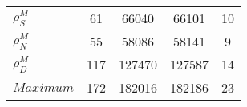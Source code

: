 \begin{center}
\begin{longtable}{lcccc}
$ {\rho^{M}_{S}}       $	 & 	                   61	 & 	                66040	 & 	                66101	 & 	                   10 \\ 
$ {\rho^{M}_{N}}       $	 & 	                   55	 & 	                58086	 & 	                58141	 & 	                    9 \\ 
$ {\rho^{M}_{D}}       $	 & 	                  117	 & 	               127470	 & 	               127587	 & 	                   14 \\ 
$Maximum               $	 & 	                  172	 & 	               182016	 & 	               182186	 & 	                   23 \\ 
\end{longtable}
 \end{center}
